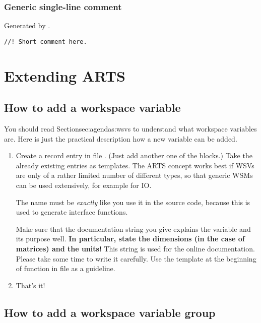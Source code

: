 \subsubsection{Generic single-line comment}

Generated by .

\begin{verbatim}
//! Short comment here.
\end{verbatim}


\section{Extending ARTS}

\subsection{How to add a workspace variable}

You should read Section{sec:agendas:wsvs} to understand what workspace
variables are. Here is just the practical description how a new
variable can be added.

\begin{enumerate}
\item Create a record entry in file . (Just add
  another one of the  blocks.) Take the
  already existing entries as templates. The ARTS concept works best
  if WSVs are only of a rather limited number of different types, so
  that generic WSMs can be used extensively, for example for IO.
      
  The name must be \emph{exactly} like you use it in the source code,
  because this is used to generate interface functions.
  
  Make sure that the documentation string you give explains the
  variable and its purpose well. \textbf{In particular, state the
    dimensions (in the case of matrices) and the units!} This string
  is used for the online documentation. Please take some time to write
  it carefully. Use the template at the beginning of function
   in file  as a
  guideline. 

\item That's it!
\end{enumerate}


\subsection{How to add a workspace variable group}

